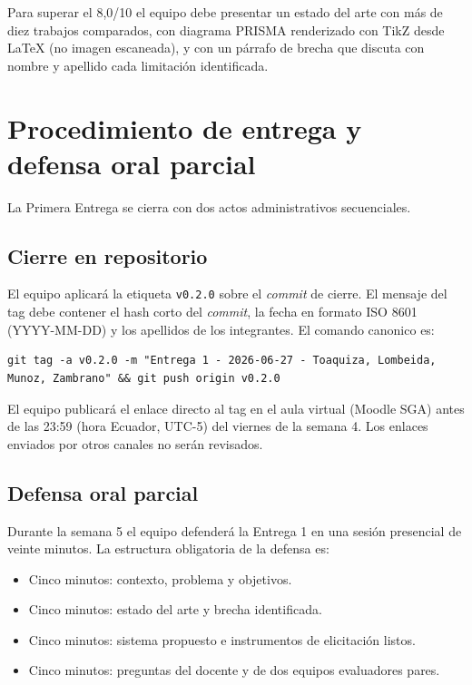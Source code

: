 \documentclass[11pt,a4paper]{article}
\begin{document}
Para superar el 8,0/10 el equipo debe presentar un estado del arte con m\'as de diez trabajos comparados, con diagrama PRISMA renderizado con TikZ desde LaTeX (no imagen escaneada), y con un p\'arrafo de brecha que discuta con nombre y apellido cada limitaci\'on identificada.

\section{Procedimiento de entrega y defensa oral parcial}

La Primera Entrega se cierra con dos actos administrativos secuenciales.

\subsection{Cierre en repositorio}

El equipo aplicar\'a la etiqueta \texttt{v0.2.0} sobre el \emph{commit} de cierre. El mensaje del tag debe contener el hash corto del \emph{commit}, la fecha en formato ISO 8601 (YYYY-MM-DD) y los apellidos de los integrantes. El comando canonico es:

\begin{lstlisting}
git tag -a v0.2.0 -m "Entrega 1 - 2026-06-27 - Toaquiza, Lombeida, Munoz, Zambrano" && git push origin v0.2.0
\end{lstlisting}

El equipo publicar\'a el enlace directo al tag en el aula virtual (Moodle SGA) antes de las 23:59 (hora Ecuador, UTC-5) del viernes de la semana 4. Los enlaces enviados por otros canales no ser\'an revisados.

\subsection{Defensa oral parcial}

Durante la semana 5 el equipo defender\'a la Entrega 1 en una sesi\'on presencial de veinte minutos. La estructura obligatoria de la defensa es:

\begin{itemize}
    \item Cinco minutos: contexto, problema y objetivos.
    \item Cinco minutos: estado del arte y brecha identificada.
    \item Cinco minutos: sistema propuesto e instrumentos de elicitaci\'on listos.
    \item Cinco minutos: preguntas del docente y de dos equipos evaluadores pares.
\end{itemize}
\end{document}
